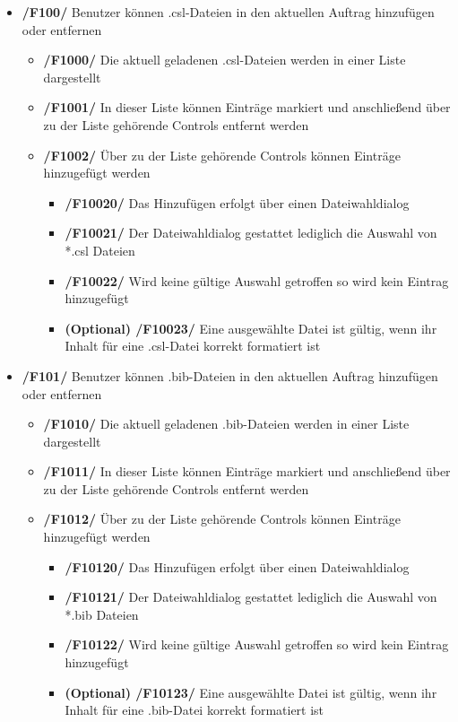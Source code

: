 \documentclass[11pt]{article} %
\begin{document}
\begin{itemize}
\item{\textbf{/F100/} Benutzer können .csl-Dateien in den aktuellen Auftrag hinzufügen oder entfernen}

\begin{itemize}
\item{\textbf{/F1000/} Die aktuell geladenen .csl-Dateien werden in einer Liste dargestellt}
\item{\textbf{/F1001/} In dieser Liste können Einträge markiert und anschließend über zu der Liste gehörende Controls entfernt werden}
\item{\textbf{/F1002/} Über zu der Liste gehörende Controls können Einträge hinzugefügt werden}

\begin{itemize}
\item{\textbf{/F10020/} Das Hinzufügen erfolgt über einen Dateiwahldialog}
\item{\textbf{/F10021/} Der Dateiwahldialog gestattet lediglich die Auswahl von *.csl Dateien}
\item{\textbf{/F10022/} Wird keine gültige Auswahl getroffen so wird kein Eintrag hinzugefügt}
\item{\textbf{(Optional) /F10023/} Eine ausgewählte Datei ist gültig, wenn ihr Inhalt für eine .csl-Datei korrekt formatiert ist}
\end{itemize}

\end{itemize}

\item{\textbf{/F101/} Benutzer können .bib-Dateien in den aktuellen Auftrag hinzufügen oder entfernen}

\begin{itemize}
\item{\textbf{/F1010/} Die aktuell geladenen .bib-Dateien werden in einer Liste dargestellt}
\item{\textbf{/F1011/} In dieser Liste können Einträge markiert und anschließend über zu der Liste gehörende Controls entfernt werden}
\item{\textbf{/F1012/} Über zu der Liste gehörende Controls können Einträge hinzugefügt werden}

\begin{itemize}
\item{\textbf{/F10120/} Das Hinzufügen erfolgt über einen Dateiwahldialog}
\item{\textbf{/F10121/} Der Dateiwahldialog gestattet lediglich die Auswahl von *.bib Dateien}
\item{\textbf{/F10122/} Wird keine gültige Auswahl getroffen so wird kein Eintrag hinzugefügt}
\item{\textbf{(Optional) /F10123/} Eine ausgewählte Datei ist gültig, wenn ihr Inhalt für eine .bib-Datei korrekt formatiert ist}
\end{itemize}


\end{itemize}
\end{itemize}
\end{document}
